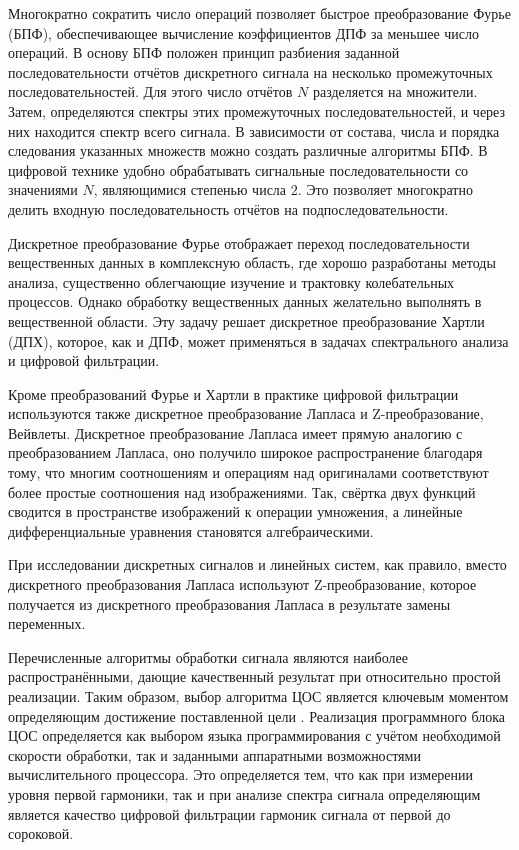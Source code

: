\documentclass[a4paper, 14pt, titlepage]{extarticle}
\begin{document}
  Многократно сократить число операций позволяет быстрое преобразование Фурье (БПФ), обеспечивающее
  вычисление коэффициентов ДПФ за меньшее число операций. В основу БПФ положен принцип разбиения
  заданной последовательности отчётов дискретного сигнала на несколько промежуточных
  последовательностей. Для этого число отчётов $N$ разделяется на множители. Затем, определяются
  спектры этих промежуточных последовательностей, и через них находится спектр всего сигнала. В
  зависимости от состава, числа и порядка следования указанных множеств можно создать различные
  алгоритмы БПФ. В цифровой технике удобно обрабатывать сигнальные последовательности со значениями
  $N$, являющимися степенью числа $2$. Это позволяет многократно делить входную
  последовательность отчётов на подпоследовательности.

  Дискретное преобразование Фурье отображает переход последовательности вещественных данных в
  комплексную область, где хорошо разработаны методы анализа, существенно облегчающие изучение и
  трактовку колебательных процессов. Однако обработку вещественных данных желательно выполнять в
  вещественной области. Эту задачу решает дискретное преобразование Хартли (ДПХ), которое, как и
  ДПФ, может применяться в задачах спектрального анализа и цифровой фильтрации.

  Кроме преобразований Фурье и Хартли в практике цифровой фильтрации используются также дискретное
  преобразование Лапласа и Z-пре\-об\-ра\-зо\-ва\-ние, Вейвлеты. Дискретное преобразование Лапласа имеет
  прямую аналогию с преобразованием Лапласа, оно получило широкое распространение благодаря тому, что
  многим соотношениям и операциям над оригиналами соответствуют более простые соотношения над
  изображениями. Так, свёртка двух функций сводится в пространстве изображений к операции умножения,
  а линейные дифференциальные уравнения становятся алгебраическими.

  При исследовании дискретных сигналов и линейных систем, как правило, вместо дискретного
  преобразования Лапласа используют Z-пре\-об\-ра\-зо\-ва\-ние, которое получается из дискретного
  преобразования Лапласа в результате замены переменных.

  Перечисленные алгоритмы обработки сигнала являются наиболее распространёнными, дающие качественный
  результат при относительно простой реализации. Таким образом, выбор алгоритма ЦОС является
  ключевым моментом определяющим достижение поставленной цели \cite{zubarev-realtime}. Реализация
  программного блока ЦОС определяется как выбором языка программирования с учётом необходимой
  скорости обработки, так и заданными аппаратными возможностями вычислительного процессора. Это
  определяется тем, что как при измерении уровня первой гармоники, так и при анализе спектра сигнала
  определяющим является качество цифровой фильтрации гармоник сигнала от первой до сороковой.
\end{document}
